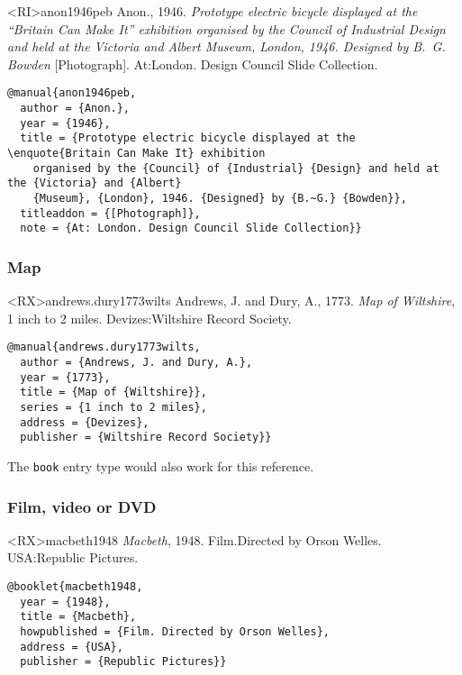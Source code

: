 \documentclass[10pt,a4paper]{article}
\newenvironment{tips}{%
  \begin{list}{\makebox[2em][c]{\faLightbulbO}}{%
    \setlength{\leftmargin}{2em}
    \setlength{\labelwidth}{2em}
    \setlength{\labelsep}{0pt}}
}{\end{list}}
\begin{document}
\begin{bibexbox}<RI>{anon1946peb}
  Anon., 1946. \emph{Prototype electric bicycle displayed at the \enquote{Britain Can Make It} exhibition organised by the Council of Industrial Design and held at the Victoria and Albert Museum, London, 1946. Designed by B.~G. Bowden} [Photograph]. At:\@ London. Design Council Slide Collection.
  \tcblower
\begin{Verbatim}
@manual{anon1946peb,
  author = {Anon.},
  year = {1946},
  title = {Prototype electric bicycle displayed at the \enquote{Britain Can Make It} exhibition
    organised by the {Council} of {Industrial} {Design} and held at the {Victoria} and {Albert}
    {Museum}, {London}, 1946. {Designed} by {B.~G.} {Bowden}},
  titleaddon = {[Photograph]},
  note = {At: London. Design Council Slide Collection}}
\end{Verbatim}
\end{bibexbox}


\subsubsection*{Map}

\begin{bibexbox}<RX>{andrews.dury1773wilts}
  Andrews, J. and Dury, A., 1773. \emph{Map of Wiltshire}, 1 inch to 2 miles. Devizes:\@ Wiltshire Record Society.
  \tcblower
\begin{Verbatim}
@manual{andrews.dury1773wilts,
  author = {Andrews, J. and Dury, A.},
  year = {1773},
  title = {Map of {Wiltshire}},
  series = {1 inch to 2 miles},
  address = {Devizes},
  publisher = {Wiltshire Record Society}}
\end{Verbatim}
\end{bibexbox}

\begin{tips}\item The \texttt{book} entry type would also work for this reference.\end{tips}

\subsubsection*{Film, video or DVD}

\begin{bibexbox}<RX>{macbeth1948}
  \emph{Macbeth}, 1948. Film.\@ Directed by Orson Welles. USA:\@ Republic Pictures.
  \tcblower
\begin{Verbatim}
@booklet{macbeth1948,
  year = {1948},
  title = {Macbeth},
  howpublished = {Film. Directed by Orson Welles},
  address = {USA},
  publisher = {Republic Pictures}}
\end{Verbatim}
\end{bibexbox}
\end{document}
